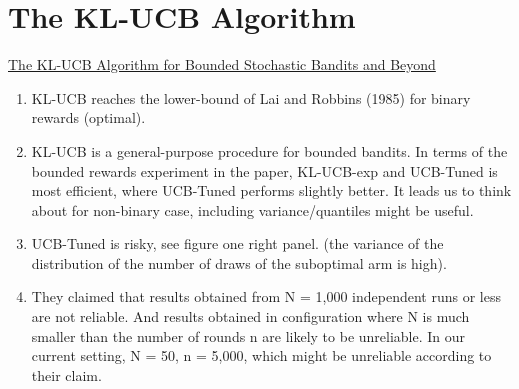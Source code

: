 \documentclass{article}
\begin{document}
\section{The KL-UCB Algorithm }
\href{https://arxiv.org/abs/1102.2490}{The KL-UCB Algorithm for Bounded Stochastic Bandits and Beyond} \cite{garivier2011kl}
\begin{enumerate}
    \item KL-UCB reaches the lower-bound of Lai and Robbins (1985) for binary rewards (optimal).
    \item KL-UCB is a general-purpose procedure for bounded bandits. In terms of the bounded rewards experiment in the paper, KL-UCB-exp and UCB-Tuned is most efficient, where UCB-Tuned performs slightly better. It leads us to think about for non-binary case, including variance/quantiles might be useful.
    \item UCB-Tuned is risky, see figure one right panel. (the variance of the distribution of the number of draws of the suboptimal arm is high).
    \item They claimed that results obtained from N = 1,000 independent runs or less are not reliable. And results obtained in configuration where N is much smaller than the number of rounds n are likely to be unreliable. In our current setting, N = 50, n = 5,000, which might be unreliable according to their claim.
\end{enumerate}
\end{document}

